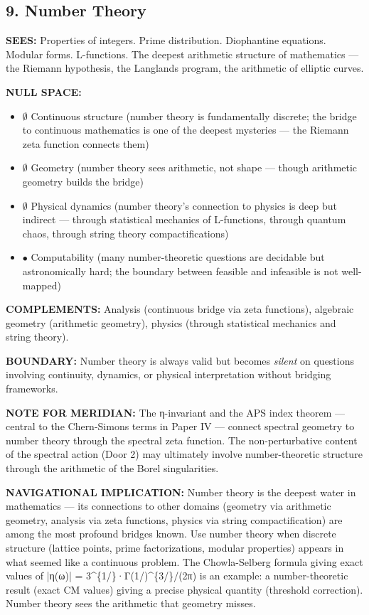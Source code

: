 \bigskip\noindent\makebox[\textwidth]{\color{rulegray}\rule{5cm}{0.3pt}}\bigskip


\subsection*{9. Number Theory}


\textbf{SEES:} Properties of integers. Prime distribution. Diophantine equations. Modular forms. L-functions. The deepest arithmetic structure of mathematics — the Riemann hypothesis, the Langlands program, the arithmetic of elliptic curves.


\textbf{NULL SPACE:}

\begin{itemize}[nosep,leftmargin=*]
  \item $\emptyset$ Continuous structure (number theory is fundamentally discrete; the bridge to continuous mathematics is one of the deepest mysteries — the Riemann zeta function connects them)
  \item $\emptyset$ Geometry (number theory sees arithmetic, not shape — though arithmetic geometry builds the bridge)
  \item $\emptyset$ Physical dynamics (number theory's connection to physics is deep but indirect — through statistical mechanics of L-functions, through quantum chaos, through string theory compactifications)
  \item $\bullet$ Computability (many number-theoretic questions are decidable but astronomically hard; the boundary between feasible and infeasible is not well-mapped)
\end{itemize}


\textbf{COMPLEMENTS:} Analysis (continuous bridge via zeta functions), algebraic geometry (arithmetic geometry), physics (through statistical mechanics and string theory).


\textbf{BOUNDARY:} Number theory is always valid but becomes \textit{silent} on questions involving continuity, dynamics, or physical interpretation without bridging frameworks.


\textbf{NOTE FOR MERIDIAN:} The η-invariant and the APS index theorem — central to the Chern-Simons terms in Paper IV — connect spectral geometry to number theory through the spectral zeta function. The non-perturbative content of the spectral action (Door 2) may ultimately involve number-theoretic structure through the arithmetic of the Borel singularities.


\textbf{NAVIGATIONAL IMPLICATION:} Number theory is the deepest water in mathematics — its connections to other domains (geometry via arithmetic geometry, analysis via zeta functions, physics via string compactification) are among the most profound bridges known. Use number theory when discrete structure (lattice points, prime factorizations, modular properties) appears in what seemed like a continuous problem. The Chowla-Selberg formula giving exact values of |η(ω)| = 3\textasciicircum{}\{1/\}·Γ(1/)\textasciicircum{}\{3/\}/\allowbreak (2π) is an example: a number-theoretic result (exact CM values) giving a precise physical quantity (threshold correction). Number theory sees the arithmetic that geometry misses.



